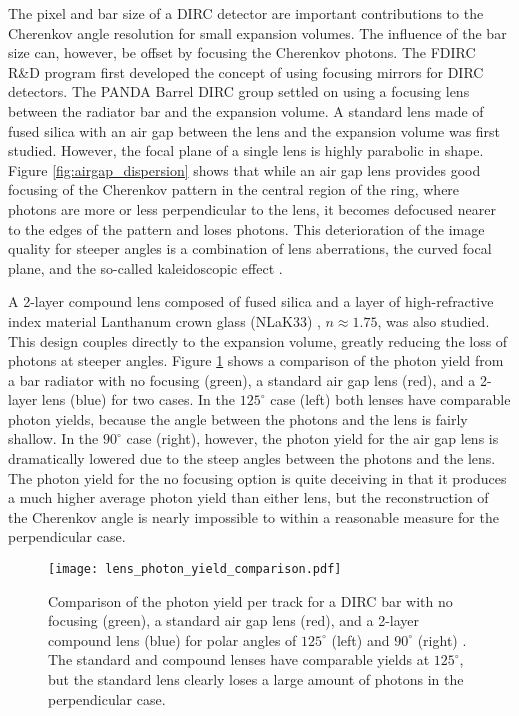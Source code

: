The pixel and bar size of a DIRC detector are important contributions to the Cherenkov angle resolution for small expansion volumes. The influence of the bar size can, however, be offset by focusing the Cherenkov photons. The FDIRC R\&D program first developed the concept of using focusing mirrors for DIRC detectors. The PANDA Barrel DIRC group settled on using a focusing lens between the radiator bar and the expansion volume. A standard lens made of fused silica with an air gap between the lens and the expansion volume was first studied. However, the focal plane of a single lens is highly parabolic in shape. Figure \ref{fig:airgap_dispersion} shows that while an air gap lens provides good focusing of the Cherenkov pattern in the central region of the ring, where photons are more or less perpendicular to the lens, it becomes defocused nearer to the edges of the pattern and loses photons. This deterioration of the image quality for steeper angles is a combination of lens aberrations, the curved focal plane, and the so-called kaleidoscopic effect \cite{FDIRCMathematica}.

A 2-layer compound lens composed of fused silica and a layer of high-refractive index material Lanthanum crown glass (NLaK33) \cite{SchottData}, $n \approx 1.75$, was also studied. This design couples directly to the expansion volume, greatly reducing the loss of photons at steeper angles. Figure \ref{fig:lens_photon_yield} shows a comparison of the photon yield from a bar radiator with no focusing (green), a standard air gap lens (red), and a 2-layer lens (blue) for two cases. In the $125^\circ$ case (left) both lenses have comparable photon yields, because the angle between the photons and the lens is fairly shallow. In the $90^\circ$ case (right), however, the photon yield for the air gap lens is dramatically lowered due to the steep angles between the photons and the lens. The photon yield for the no focusing option is quite deceiving in that it produces a much higher average photon yield than either lens, but the reconstruction of the Cherenkov angle is nearly impossible to within a reasonable measure for the perpendicular case.

\begin{figure}[!htb]
	\centering
	\texttt{[image: lens\_photon\_yield\_comparison.pdf]}
	\caption[Comparison of the photon yield per track for a DIRC bar with no focusing (green), a standard air gap lens (red), and a 2-layer compound lens (blue) for polar angles of $125^\circ$ (left) and $90^\circ$ (right).]{Comparison of the photon yield per track for a DIRC bar with no focusing (green), a standard air gap lens (red), and a 2-layer compound lens (blue) for polar angles of $125^\circ$ (left) and $90^\circ$ (right) \cite{GregThesis}. The standard and compound lenses have comparable yields at $125^\circ$, but the standard lens clearly loses a large amount of photons in the perpendicular case.}
	\label{fig:lens_photon_yield}
\end{figure}

